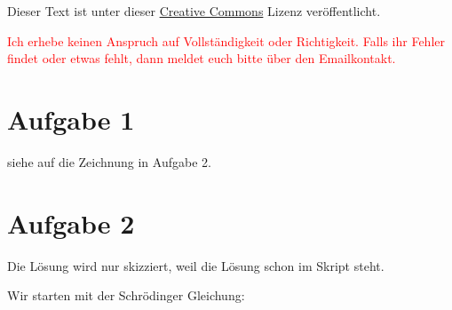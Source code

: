 




\maketitle

Dieser Text ist unter dieser \href{http://creativecommons.org/licenses/by-nc-sa/4.0/}{Creative Commons} Lizenz veröffentlicht.

\textcolor{red}{Ich erhebe keinen Anspruch auf Vollständigkeit oder Richtigkeit. Falls ihr Fehler findet oder etwas fehlt, dann meldet euch bitte über den Emailkontakt.}

\tableofcontents


\newpage



\section{Aufgabe 1}

siehe auf die Zeichnung in Aufgabe 2.


\section{Aufgabe 2}

Die Lösung wird nur skizziert, weil die Lösung schon im Skript steht.

Wir starten mit der Schrödinger Gleichung:

